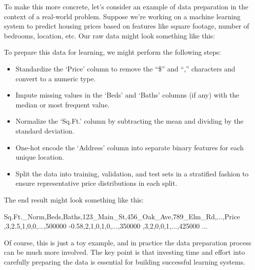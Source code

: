 \documentclass[
  9pt,
  letterpaper,
  abstract,
  titlepage]{scrbook}
\newenvironment{Shaded}{\begin{snugshade}}{\end{snugshade}}
\newcommand{\NormalTok}[1]{\textcolor[rgb]{0.00,0.23,0.31}{#1}}
\begin{document}
To make this more concrete, let's consider an example of data
preparation in the context of a real-world problem. Suppose we're
working on a machine learning system to predict housing prices based on
features like square footage, number of bedrooms, location, etc. Our raw
data might look something like this:

\begin{Shaded}
\end{Shaded}

To prepare this data for learning, we might perform the following steps:

\begin{itemize}
\item
  Standardize the `Price' column to remove the ``\$'' and ``,''
  characters and convert to a numeric type.
\item
  Impute missing values in the `Beds' and `Baths' columns (if any) with
  the median or most frequent value.
\item
  Normalize the `Sq.Ft.' column by subtracting the mean and dividing by
  the standard deviation.
\item
  One-hot encode the `Address' column into separate binary features for
  each unique location.
\item
  Split the data into training, validation, and test sets in a
  stratified fashion to ensure representative price distributions in
  each split.
\end{itemize}

The end result might look something like this:

\begin{Shaded}
\begin{Highlighting}[]
\NormalTok{Sq.Ft.\_Norm,Beds,Baths,123\_Main\_St,456\_Oak\_Ave,789\_Elm\_Rd,...,Price}
\NormalTok{,3,2.5,1,0,0,...,500000}
\NormalTok{{-}0.58,2,1,0,1,0,...,350000}
\NormalTok{,3,2,0,0,1,...,425000}
\NormalTok{...}
\end{Highlighting}
\end{Shaded}

Of course, this is just a toy example, and in practice the data
preparation process can be much more involved. The key point is that
investing time and effort into carefully preparing the data is essential
for building successful learning systems.
\end{document}
